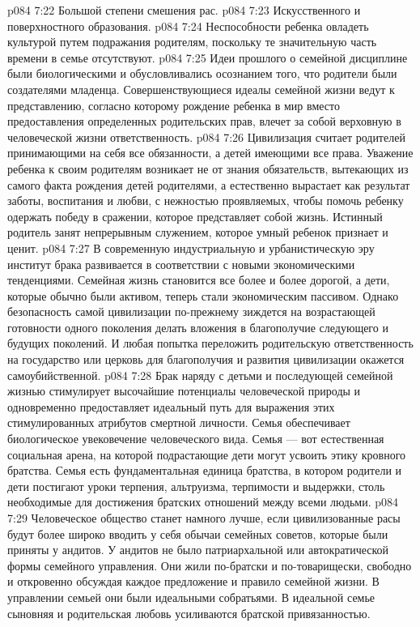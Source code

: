\vs p084 7:22 \bibnobreakspace Большой степени смешения рас.
\vs p084 7:23 \bibnobreakspace Искусственного и поверхностного образования.
\vs p084 7:24 \bibnobreakspace Неспособности ребенка овладеть культурой путем подражания родителям, поскольку те значительную часть времени в семье отсутствуют.
\vs p084 7:25 \pc Идеи прошлого о семейной дисциплине были биологическими и обусловливались осознанием того, что родители были создателями младенца. Совершенствующиеся идеалы семейной жизни ведут к представлению, согласно которому рождение ребенка в мир вместо предоставления определенных родительских прав, влечет за собой верховную в человеческой жизни ответственность.
\vs p084 7:26 Цивилизация считает родителей принимающими на себя все обязанности, а детей имеющими все права. Уважение ребенка к своим родителям возникает не от знания обязательств, вытекающих из самого факта рождения детей родителями, а естественно вырастает как результат заботы, воспитания и любви, с нежностью проявляемых, чтобы помочь ребенку одержать победу в сражении, которое представляет собой жизнь. Истинный родитель занят непрерывным служением, которое умный ребенок признает и ценит.
\vs p084 7:27 \pc В современную индустриальную и урбанистическую эру институт брака развивается в соответствии с новыми экономическими тенденциями. Семейная жизнь становится все более и более дорогой, а дети, которые обычно были активом, теперь стали экономическим пассивом. Однако безопасность самой цивилизации по\hyp{}прежнему зиждется на возрастающей готовности одного поколения делать вложения в благополучие следующего и будущих поколений. И любая попытка переложить родительскую ответственность на государство или церковь для благополучия и развития цивилизации окажется самоубийственной.
\vs p084 7:28 \pc Брак наряду с детьми и последующей семейной жизнью стимулирует высочайшие потенциалы человеческой природы и одновременно предоставляет идеальный путь для выражения этих стимулированных атрибутов смертной личности. Семья обеспечивает биологическое увековечение человеческого вида. Семья --- вот естественная социальная арена, на которой подрастающие дети могут усвоить этику кровного братства. Семья есть фундаментальная единица братства, в котором родители и дети постигают уроки терпения, альтруизма, терпимости и выдержки, столь необходимые для достижения братских отношений между всеми людьми.
\vs p084 7:29 Человеческое общество станет намного лучше, если цивилизованные расы будут более широко вводить у себя обычаи семейных советов, которые были приняты у андитов. У андитов не было патриархальной или автократической формы семейного управления. Они жили по\hyp{}братски и по\hyp{}товарищески, свободно и откровенно обсуждая каждое предложение и правило семейной жизни. В управлении семьей они были идеальными собратьями. В идеальной семье сыновняя и родительская любовь усиливаются братской привязанностью.
